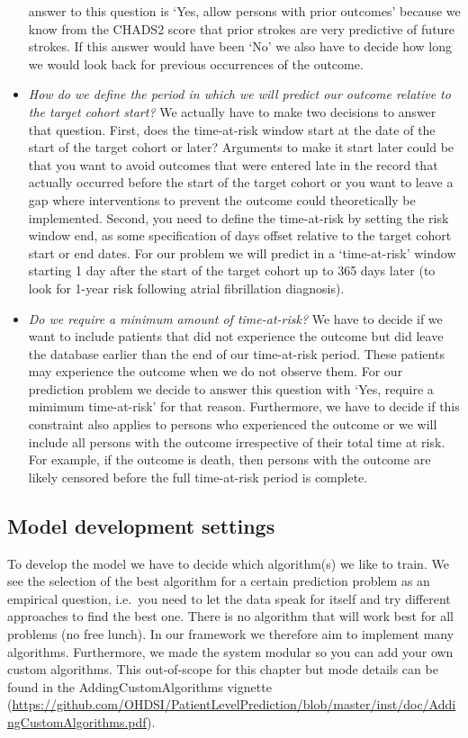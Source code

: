 \documentclass[]{book}
\begin{document}
\begin{itemize}
  answer to this question is `Yes, allow persons with prior outcomes'
  because we know from the CHADS2 score that prior strokes are very
  predictive of future strokes. If this answer would have been `No' we
  also have to decide how long we would look back for previous
  occurrences of the outcome.
\item
  \emph{How do we define the period in which we will predict our outcome
  relative to the target cohort start?} We actually have to make two
  decisions to answer that question. First, does the time-at-risk window
  start at the date of the start of the target cohort or later?
  Arguments to make it start later could be that you want to avoid
  outcomes that were entered late in the record that actually occurred
  before the start of the target cohort or you want to leave a gap where
  interventions to prevent the outcome could theoretically be
  implemented. Second, you need to define the time-at-risk by setting
  the risk window end, as some specification of days offset relative to
  the target cohort start or end dates. For our problem we will predict
  in a `time-at-risk' window starting 1 day after the start of the
  target cohort up to 365 days later (to look for 1-year risk following
  atrial fibrillation diagnosis).
\item
  \emph{Do we require a minimum amount of time-at-risk?} We have to
  decide if we want to include patients that did not experience the
  outcome but did leave the database earlier than the end of our
  time-at-risk period. These patients may experience the outcome when we
  do not observe them. For our prediction problem we decide to answer
  this question with `Yes, require a mimimum time-at-risk' for that
  reason. Furthermore, we have to decide if this constraint also applies
  to persons who experienced the outcome or we will include all persons
  with the outcome irrespective of their total time at risk. For
  example, if the outcome is death, then persons with the outcome are
  likely censored before the full time-at-risk period is complete.
\end{itemize}

\subsection{Model development
settings}\label{model-development-settings}

To develop the model we have to decide which algorithm(s) we like to
train. We see the selection of the best algorithm for a certain
prediction problem as an empirical question, i.e.~you need to let the
data speak for itself and try different approaches to find the best one.
There is no algorithm that will work best for all problems (no free
lunch). In our framework we therefore aim to implement many algorithms.
Furthermore, we made the system modular so you can add your own custom
algorithms. This out-of-scope for this chapter but mode details can be
found in the AddingCustomAlgorithms vignette
(\url{https://github.com/OHDSI/PatientLevelPrediction/blob/master/inst/doc/AddingCustomAlgorithms.pdf}).
\end{document}
